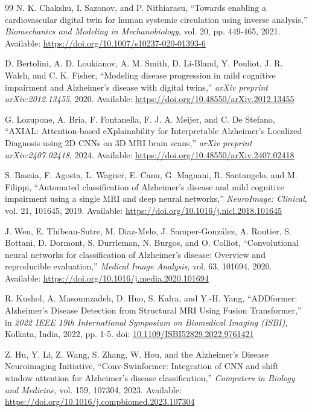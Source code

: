 \documentclass[pdflatex,sn-mathphys-num]{sn-jnl}%
\theoremstyle{thmstyleone}%
\theoremstyle{thmstyletwo}%
\theoremstyle{thmstylethree}%
\begin{document}
\begin{thebibliography}{99}
 N. K. Chakshu, I. Sazonov, and P. Nithiarasu, ``Towards enabling a cardiovascular digital twin for human systemic circulation using inverse analysis,'' \textit{Biomechanics and Modeling in Mechanobiology}, vol. 20, pp. 449-465, 2021. Available: \url{https://doi.org/10.1007/s10237-020-01393-6}

 D. Bertolini, A. D. Loukianov, A. M. Smith, D. Li-Bland, Y. Pouliot, J. R. Walsh, and C. K. Fisher, ``Modeling disease progression in mild cognitive impairment and Alzheimer's disease with digital twins,'' \textit{arXiv preprint arXiv:2012.13455}, 2020. Available: \url{https://doi.org/10.48550/arXiv.2012.13455}

 G. Lozupone, A. Bria, F. Fontanella, F. J. A. Meijer, and C. De Stefano, ``AXIAL: Attention-based eXplainability for Interpretable Alzheimer's Localized Diagnosis using 2D CNNs on 3D MRI brain scans,'' \textit{arXiv preprint arXiv:2407.02418}, 2024. Available: \url{https://doi.org/10.48550/arXiv.2407.02418}

 S. Basaia, F. Agosta, L. Wagner, E. Canu, G. Magnani, R. Santangelo, and M. Filippi, ``Automated classification of Alzheimer's disease and mild cognitive impairment using a single MRI and deep neural networks,'' \textit{NeuroImage: Clinical}, vol. 21, 101645, 2019. Available: \url{https://doi.org/10.1016/j.nicl.2018.101645}

 J. Wen, E. Thibeau-Sutre, M. Diaz-Melo, J. Samper-González, A. Routier, S. Bottani, D. Dormont, S. Durrleman, N. Burgos, and O. Colliot, ``Convolutional neural networks for classification of Alzheimer's disease: Overview and reproducible evaluation,'' \textit{Medical Image Analysis}, vol. 63, 101694, 2020. Available: \url{https://doi.org/10.1016/j.media.2020.101694}

 R. Kushol, A. Masoumzadeh, D. Huo, S. Kalra, and Y.-H. Yang, ``ADDformer: Alzheimer's Disease Detection from Structural MRI Using Fusion Transformer,'' in \textit{2022 IEEE 19th International Symposium on Biomedical Imaging (ISBI)}, Kolkata, India, 2022, pp. 1-5. doi: \url{10.1109/ISBI52829.2022.9761421}

 Z. Hu, Y. Li, Z. Wang, S. Zhang, W. Hou, and the Alzheimer's Disease Neuroimaging Initiative, ``Conv-Swinformer: Integration of CNN and shift window attention for Alzheimer's disease classification,'' \textit{Computers in Biology and Medicine}, vol. 159, 107304, 2023. Available: \url{https://doi.org/10.1016/j.compbiomed.2023.107304}


\end{thebibliography}
\end{document}

